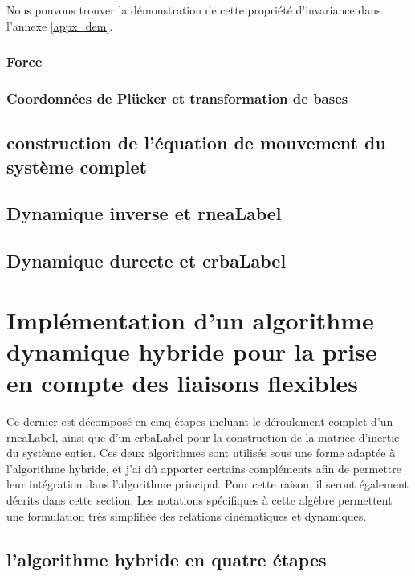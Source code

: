 \documentclass{report}
\begin{document}
Nous pouvons trouver la démonstration de cette propriété d'invariance dans l'annexe \ref{appx_dem}. 



\subsection{Force}

\subsection{Coordonnées de Plücker et transformation de bases}


\section{construction de l'équation de mouvement du système complet}

\section{Dynamique inverse et \gls{rneaLabel}}

\section{Dynamique durecte et \gls{crbaLabel}}



\chapter{Implémentation d'un algorithme dynamique hybride pour la prise en compte des liaisons flexibles}

Ce dernier est décomposé en cinq étapes incluant le déroulement complet d'un \gls{rneaLabel}, ainsi que d'un \gls{crbaLabel} pour la construction de la matrice d'inertie du système entier. Ces deux algorithmes sont utilisés sous une forme adaptée à l'algorithme hybride, et j'ai dû apporter certains compléments afin de permettre leur intégration dans l'algorithme principal. Pour cette raison, il seront également décrits dans cette section. Les notations spécifiques à cette algèbre permettent une formulation très simplifiée des relations cinématiques et dynamiques.\\


\section{l'algorithme hybride en quatre étapes}
\end{document}
